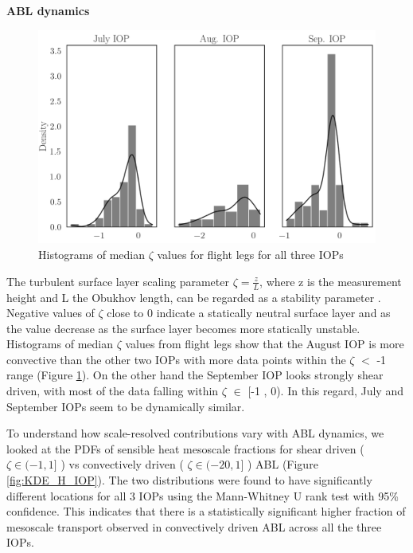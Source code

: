 \documentclass[draft]{agujournal2019}
\begin{document}
\textbf{ABL dynamics}

\begin{figure}[hbtp]
 \noindent\includegraphics[width=\textwidth]{figures_main/zL_IOP.png}
\caption{ Histograms of median $\zeta$ values for flight legs for all three IOPs}
\label{fig:zL_IOP}
\end{figure}
The turbulent surface layer scaling parameter $\zeta = \frac{z}{L}$, where z is the measurement height and L the Obukhov length, can be regarded as a stability parameter \cite{stull_introduction_1988}. Negative values of $\zeta$ close to 0 indicate a statically neutral surface layer and as the value decrease as the surface layer becomes more statically unstable. \\
Histograms of median $\zeta$ values from flight legs show that the August IOP is more convective than the other two IOPs with more data points within the  $\zeta$ $<$ -1 range (Figure \ref{fig:zL_IOP}). On the other hand the September IOP looks strongly shear driven, with most of the data falling within $\zeta$ $\in$ [-1 , 0). In this regard, July and September IOPs seem to be dynamically similar.

To understand how scale-resolved contributions vary with ABL dynamics, we looked at the PDFs of sensible heat mesoscale fractions for shear driven ( $\zeta \in (-1,1]$  ) vs convectively driven ( $\zeta \in (-20,1]$  ) ABL (Figure \ref{fig:KDE_H_IOP}). The two distributions were found to have significantly different locations for all 3 IOPs using the Mann-Whitney U rank test with 95\% confidence. This indicates that there is a statistically significant higher fraction of mesoscale transport observed in convectively driven ABL across all the three IOPs.
\end{document}
